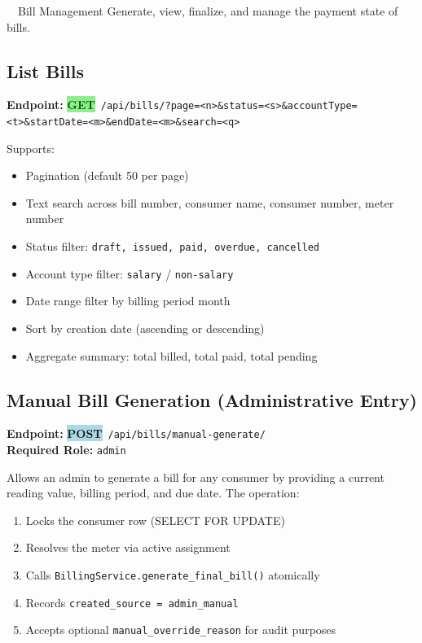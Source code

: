 \documentclass[12pt, a4paper]{report}
\newcommand{\httpget}{\colorbox{lightGreen}{\textcolor{darkGreen}{\textbf{\small GET}}}}
\newcommand{\httppost}{\colorbox{lightBlue}{\textcolor{deepBlue}{\textbf{\small POST}}}}
\newenvironment{featurelist}{%
    \begin{itemize}[leftmargin=1.5em, itemsep=2pt, parsep=0pt]
}{%
    \end{itemize}
}
\begin{document}
\begin{modulebox}{\faFileInvoice\ \ Bill Management}
Generate, view, finalize, and manage the payment state of bills.
\end{modulebox}

\subsection{List Bills}
\textbf{Endpoint:} \httpget\ \texttt{/api/bills/?page=<n>\&status=<s>\&accountType=<t>\&startDate=<m>\&endDate=<m>\&search=<q>}

Supports:
\begin{featurelist}
    \item Pagination (default 50 per page)
    \item Text search across bill number, consumer name, consumer number, meter number
    \item Status filter: \texttt{draft, issued, paid, overdue, cancelled}
    \item Account type filter: \texttt{salary} / \texttt{non-salary}
    \item Date range filter by billing period month
    \item Sort by creation date (ascending or descending)
    \item Aggregate summary: total billed, total paid, total pending
\end{featurelist}

\subsection{Manual Bill Generation (Administrative Entry)}
\textbf{Endpoint:} \httppost\ \texttt{/api/bills/manual-generate/}\\
\textbf{Required Role:} \texttt{admin}

Allows an admin to generate a bill for any consumer by providing a current reading value, billing period, and due date. The operation:
\begin{enumerate}[leftmargin=1.8em]
    \item Locks the consumer row (SELECT FOR UPDATE)
    \item Resolves the meter via active assignment
    \item Calls \texttt{BillingService.generate\_final\_bill()} atomically
    \item Records \texttt{created\_source = admin\_manual}
    \item Accepts optional \texttt{manual\_override\_reason} for audit purposes
\end{enumerate}
\end{document}

